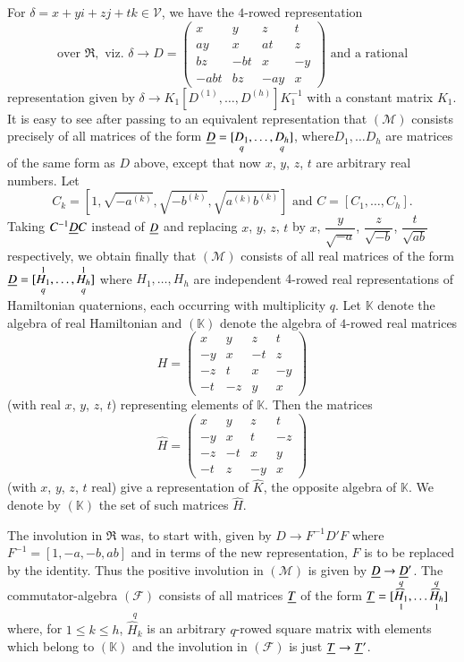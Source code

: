 For $\delta=x+yi+zj+tk\in\mathscr{V}$, we have the $4$-rowed\label{p63} 
representation 
$$
\text{over } \mathfrak{R}, \text{ viz. } \delta\to D=
\begin{pmatrix}
x & y & z & t\\
ay & x & at & z\\
bz & -bt & x & -y\\
-abt & bz & -ay & x
\end{pmatrix}
\text{ and a rational}
$$
representation given by $\delta\to
K_{1}[D^{(1)},\ldots,D^{(h)}]K^{-1}_{1}$ with a constant matrix
$K_{1}$. It is easy to see after passing to an equivalent
representation that $(\mathscr{M})$ consists precisely of all matrices
of the form $\underline{D}=[\underset{q}{D_{1}},\ldots,\underset{q}{D_{h}}]$,
where\pageoriginale $D_{1},\ldots D_{h}$ are matrices of the same form
as $D$ above, except that now $x$, $y$, $z$, $t$ are arbitrary real
numbers. Let 
$$
C_{k}=\left[1,\sqrt{-a^{(k)}}, \sqrt{-b^{(k)}},
  \sqrt{a^{(k)}b^{(k)}}\right]\text{ \ and \ } C=[C_{1},\ldots,C_{h}].
$$
Taking $C^{-1}\underline{D}C$ instead of $\underline{D}$ and replacing $x$, $y$,
$z$, $t$ by $x$, $\dfrac{y}{\sqrt{-a}}$, $\dfrac{z}{\sqrt{-b}}$,
$\dfrac{t}{\sqrt{ab}}$ respectively, we obtain finally that
$(\mathscr{M})$ consists of all real matrices of the form
$\underline{D}=[\underset{q}{\overset{1}{H_{1}}},\ldots,\underset{q}{\overset{1}{H_{h}}}]$ 
where $H_{1},\ldots,H_{h}$ are independent $4$-rowed real
representations of Hamiltonian quaternions, each occurring with
multiplicity $q$. Let $\mathbb{K}$ denote the algebra of real
Hamiltonian and $(\mathbb{K})$ denote the algebra of $4$-rowed real
matrices 
$$
H=
\begin{pmatrix}
x & y & z & t\\
-y & x & -t & z\\
-z & t & x & -y\\
-t & -z & y & x
\end{pmatrix}
$$
(with real $x$, $y$, $z$, $t$) representing elements of
$\mathbb{K}$. Then the matrices
$$
\widehat{H}=
\begin{pmatrix}
x & y & z & t\\
-y & x & t & -z\\
-z & -t & x & y\\
-t & z & -y & x
\end{pmatrix}
$$
(with $x$, $y$, $z$, $t$ real) give a representation of $\widehat{K}$,
the opposite algebra of $\mathbb{K}$. We denote by $(\mathbb{K})$ the
set of such matrices $\widehat{H}$.


The involution in $\mathfrak{R}$ was, to start with, given by $D\to
F^{-1}D'F$ where $F^{-1}=[1,-a,-b,ab]$ and in terms of the new
representation, $F$ is to be replaced by the identity. Thus the
positive involution in $(\mathscr{M})$ is given by $\underline{D}\to
\underline{D}'$. The commutator-algebra $(\mathscr{F})$ consists of all
matrices $\underline{T}$ of the form
$\underline{T}=[\underset{1}{\overset{q}{\widehat{H}_{1}}},\ldots\underset{1}{\overset{q}{\widehat{H}_{h}}}]$
where, for $1\leq k\leq h$, $\overset{q}{\widehat{H}_{k}}$ is an
arbitrary $q$-rowed square matrix with elements which belong to
$(\mathbb{K})$ and the involution in $(\mathscr{F})$ is just
$\underline{T}\to \underline{T}'$. 


